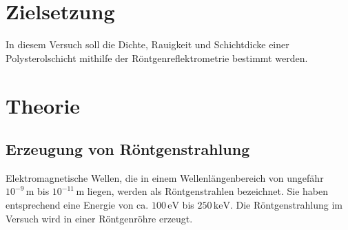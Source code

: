 \section{Zielsetzung}
In diesem Versuch soll die Dichte, Rauigkeit und Schichtdicke einer Polysterolschicht
mithilfe der Röntgenreflektrometrie bestimmt werden.

\section{Theorie}

\subsection{Erzeugung von Röntgenstrahlung}
Elektromagnetische Wellen, die in einem Wellenlängenbereich von ungefähr $10^{-9}\,\unit{\meter}$ bis $10^{-11}\,\unit{\meter}$
liegen, werden als Röntgenstrahlen bezeichnet. Sie haben entsprechend eine Energie von ca. $100\,\unit{\electronvolt}$ bis $250\,\unit{\kilo\electronvolt}$.
Die Röntgenstrahlung im Versuch wird in einer Röntgenröhre erzeugt.

